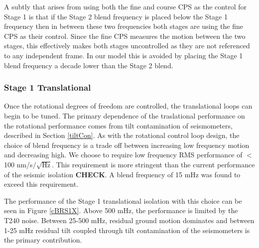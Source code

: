 \documentclass [12pt, proquest]{uwthesis}[2019]
\begin{document}
A subtly that arises from using both the fine and course CPS as the control for Stage 1 is that if the Stage 2 blend frequency is placed below the Stage 1 frequency then in between these two frequencies both stages are using the fine CPS as their control. Since the fine CPS measures the motion between the two stages, this effectively makes both stages uncontrolled as they are not referenced to any independent frame. In our model this is avoided by placing the Stage 1 blend frequency a decade lower than the Stage 2 blend.

\subsubsection{Stage 1 Translational}

Once the rotational degrees of freedom are controlled, the translational loops can begin to be tuned. The primary dependence of the traslational performance on the rotational performance comes from tilt contamination of seismometers, described in Section \ref{tiltCon}. As with the rotational control loop design, the choice of blend frequency is a trade off between increasing low frequency motion and decreasing high. We choose to require low frequency RMS performance of $<$ 100 nm/s$/\sqrt{\text{Hz}}$. This requirement is more stringent than the current performance of the seismic isolation \textbf{CHECK}. A blend frequency of 15 mHz was found to exceed this requirement.

The performance of the Stage 1 translational isolation with this choice can be seen in Figure \ref{cBRS1X}. Above 500 mHz, the performance is limited by the T240 noise. Between 25-500 mHz, residual ground motion dominates and between 1-25 mHz residual tilt coupled through tilt contamination of the seismometers is the primary contribution. 
\end{document}
